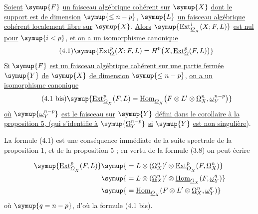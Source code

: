  \uline{Soient} $\symup{F}$ \uline{un faisceau algébrique cohérent sur} $\symup{X}$ \uline{dont le
support est de dimension} $\symup{\leq n-p}$, $\symup{L}$ \uline{un faisceau algébrique cohérent
localement libre sur} $\symup{X}$. \uline{Alors} $\symup{\operatorname{Ext}_{\Osh_X}^{i}(X;F,L)}$ \uline{est nul
pour} $\symup{i<p}$, \uline{et on a un isomorphisme canonique}
\begin{equation}\tag{4.1}
  \symup{\operatorname{Ext}_{\Osh}^{p}(X;F,L)
  =H^{0}\bigl(X,\Extsh_{\Osh}^{p}(F,L)\bigr)}
\end{equation}
\uline{Si} $\symup{F}$ \uline{est un faisceau algébrique cohérent sur une partie fermée} $\symup{Y}$ \uline{de} $\symup{X}$ \uline{de
dimension} $\symup{\leq n-p}$, \uline{on a un isomorphisme canonique}
\begin{equation}\tag{4.1 bis}
  \symup{\Extsh_{\Osh_X}^{p}(F,L)
  =\Homsh_{\Osh_X}\!\left(
    F\otimes L'\otimes\underline{\Omega}_X^{n},\underline{\omega}_Y^{n-p}
  \right)}
\end{equation}
\uline{où} $\symup{\underline{\omega}_Y^{n-p}}$ \uline{est le faisceau sur} $\symup{Y}$ \uline{défini dans le corollaire à la
proposition 5, (qui s'identifie à} $\symup{\underline{\Omega}_Y^{n-p}}$ \uline{si} $\symup{Y}$ \uline{est non singulière}).

La formule (4.1) est une conséquence immédiate de la suite spectrale de la
proposition 1, et de la proposition 5 ; en vertu de la formule (3.8) on peut
écrire

\[
\begin{aligned}
\symup{\Extsh_{\Osh_X}^{p}(F,L)}
&\symup{{}=L\otimes(\underline{\Omega}_X^{n})'\otimes
  \Extsh_{\Osh_X}^{p}(F,\underline{\Omega}_X^{n})}\\
&\symup{{}=L\otimes(\underline{\Omega}_X^{n})'\otimes
  \Homsh_{\Osh_X}(F,\underline{\omega}_Y^{q})}\\
&\symup{{}=\Homsh_{\Osh_X}\!\left(
  F\otimes L'\otimes\underline{\Omega}_X^{n},\underline{\omega}_Y^{q}\right)}
\end{aligned}
\]
où $\symup{q=n-p}$, d'où la formule (4.1 bis).

